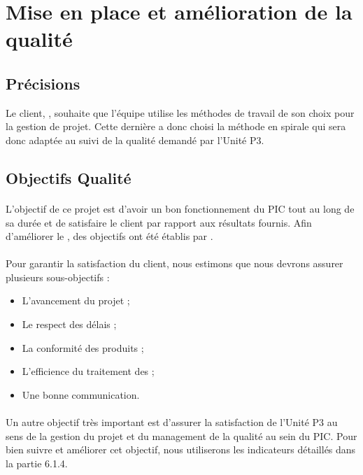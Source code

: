 
\section{Mise en place et amélioration de la qualité}\label{qualite}

\subsection{Précisions}
\label{Precisions}
Le client, \nomClient , souhaite que l’équipe \nomEquipe{} utilise les méthodes de travail de son choix pour
la gestion de projet. Cette dernière a donc choisi la méthode en spirale qui sera donc adaptée au suivi de la qualité demandé par l’Unité P3.

\subsection{Objectifs Qualité}
\label{Objectifs qualite}
\paragraph*{} L’objectif de ce projet est d’avoir un bon fonctionnement du PIC tout au long de sa durée et de satisfaire le client par rapport aux résultats fournis. Afin d’améliorer le \SMQ , des objectifs ont été établis par \nomEquipe .
\paragraph*{} Pour garantir la satisfaction du client, nous estimons que nous devrons assurer plusieurs
sous-objectifs :
\begin{itemize} 
          \item L’avancement du projet ;
          \item Le respect des délais ;
          \item La conformité des produits ;
	\item L’efficience du traitement des \FT ;
	\item Une bonne communication.
	
 \end{itemize}
\paragraph*{} Un autre objectif très important est d’assurer la satisfaction de l’Unité P3 au sens de
la gestion du projet et du management de la qualité au sein du PIC. Pour bien suivre et
améliorer cet objectif, nous utiliserons les indicateurs détaillés dans la partie 6.1.4.


